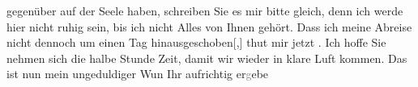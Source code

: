               gegenüber auf der Seele haben, schreiben Sie es mir bitte gleich, denn ich werde hier
               nicht ruhig sein, bis ich nicht Alles von Ihnen gehört. Dass ich meine Abreise nicht
               dennoch um einen Tag hinausgeschoben{[},{]} thut mir jetzt . Ich hoffe Sie nehmen sich die halbe Stunde
               Zeit, damit wir wieder in klare Luft kommen. Das ist nun mein ungeduldiger Wun\pend
           \pstart Ihr aufrichtig er\textcolor{gray}{g}ebe\pend{}\endnumbering{}  \newcommand{\dateiname}{L03186}\newcommand{\titel}{Felix Salten an Arthur Schnitzler, 10. 8. 1892}\newcommand{\editorInnen}{Martin Anton Müller und Laura Untner}
